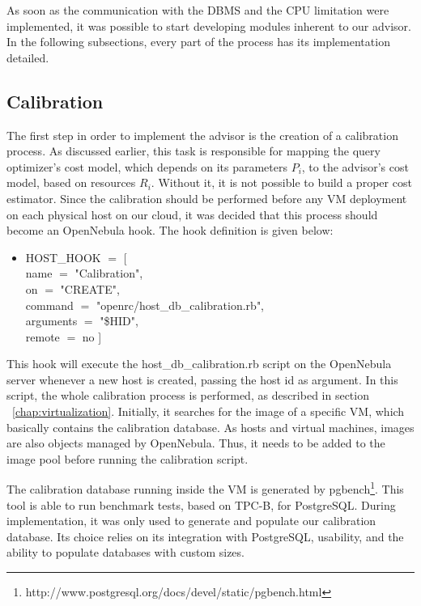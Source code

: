 \documentclass[jidm,a4paper]{jidm} %
\begin{document}
As soon as the communication with the DBMS and the CPU limitation were implemented, it was possible to start developing modules inherent to our advisor. In the following subsections, every part of the process has its implementation detailed.

\subsection{Calibration}
\label{sec:calib}

The first step in order to implement the advisor is the creation of a calibration process. As discussed earlier, this task is responsible for mapping the query optimizer's cost model, which depends on its parameters $P_{i}$, to  the advisor's cost model, based on resources $R_{i}$. Without it, it is not possible to build a proper cost estimator. Since the calibration should be performed before any VM deployment on each physical host on our cloud, it was decided that this process should become an OpenNebula hook. The hook definition is given below:
\begin{itemize}
 \item HOST\_HOOK $=$ [ \\
    name      $=$ "Calibration",\\
    on        $=$ "CREATE",\\
    command   $=$ "openrc/host\_db\_calibration.rb",\\
    arguments $=$ "\$HID",\\
    remote    $=$ no ]\\
\end{itemize}

This hook will execute the host\_db\_calibration.rb script on the OpenNebula server whenever a new host is created, passing the host id as argument. In this script, the whole calibration process is performed, as described in section ~\ref{chap:virtualization}. Initially, it searches for the image of a specific VM, which basically contains the calibration database. As hosts and virtual machines, images are also objects managed by OpenNebula. Thus, it needs to be added to the image pool before running the calibration script.

The calibration database running inside the VM is generated by pgbench\footnote{http://www.postgresql.org/docs/devel/static/pgbench.html}. This tool is able to run benchmark tests, based on TPC-B, for PostgreSQL. During implementation, it was only used to generate and populate our calibration database. Its choice relies on its integration with PostgreSQL, usability, and the ability to populate databases with custom sizes.
\end{document}
